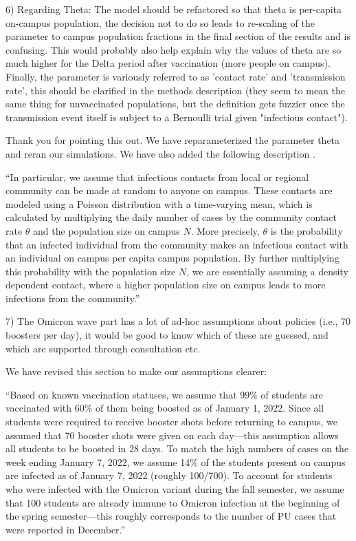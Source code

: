 \documentclass[12pt]{article}
\newcommand{\revtext}{\textsf}
\begin{document}
\revtext{6) Regarding Theta: The model should be refactored so that theta is per-capita on-campus population, the decision not to do so leads to re-scaling of the parameter to campus population fractions in the final section of the results and is confusing. This would probably also help explain why the values of theta are so much higher for the Delta period after vaccination (more people on campus). Finally, the parameter is variously referred to as 'contact rate' and 'transmission rate', this should be clarified in the methods description (they seem to mean the same thing for unvaccinated populations, but the definition gets fuzzier once the transmission event itself is subject to a Bernoulli trial given "infectious contact").}

Thank you for pointing this out. 
We have reparameterized the parameter theta and reran our simulations.
We have also added the following description .

``In particular, we assume that infectious contacts from local or regional community can be made at random to anyone on campus.
These contacts are modeled using a Poisson distribution with a time-varying mean, which is calculated by multiplying the daily number of cases by the community contact rate $\theta$ and the population size on campus $N$.
More precisely, $\theta$ is the probability that an infected individual from the community makes an infectious contact with an individual on campus per capita campus population. 
By further multiplying this probability with the population size $N$, we are essentially assuming a density dependent contact, where a higher population size on campus leads to more infections from the community.''

\revtext{7) The Omicron wave part has a lot of ad-hoc assumptions about policies (i.e., 70 boosters per day), it would be good to know which of these are guessed, and which are supported through consultation etc.}

We have revised this section to make our assumptions clearer:

``Based on known vaccination statuses, we assume that 99\% of students are vaccinated with 60\% of them being boosted as of January 1, 2022.
Since all students were required to receive booster shots before returning to campus, we assumed that 70 booster shots were given on each day---this assumption allows all students to be boosted in 28 days.
To match the high numbers of cases on the week ending January 7, 2022, we assume 14\% of the students present on campus are infected as of January 7, 2022 (roughly 100/700).
To account for students who were infected with the Omicron variant during the fall semester, we assume that 100 students are already immune to Omicron infection at the beginning of the spring semester---this roughly corresponds to the number of PU cases that were reported in December.''
\end{document}
